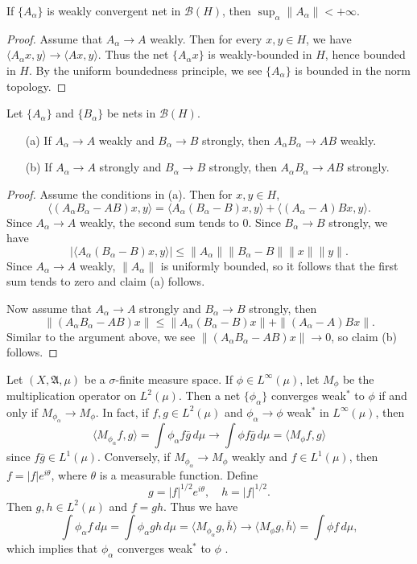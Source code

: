 \begin{proposition}\label{Hilbert space weakly convergent operator bounded}
If $\{A_\alpha\}$ is weakly convergent net in $\mathcal{B}(H)$, then $\sup_\alpha\|A_\alpha\|<+\infty$. 
\end{proposition}
\begin{proof}
Assume that $A_\alpha\to A$ weakly. Then for every $x,y\in H$, we have $\langle A_\alpha x,y\rangle\to\langle Ax,y\rangle$. Thus the net $\{A_\alpha x\}$ is weakly-bounded in $H$, hence bounded in $H$. By the uniform boundedness principle, we see $\{A_\alpha\}$ is bounded in the norm topology.
\end{proof}
\begin{proposition}\label{Hilbert space continuity of composition}
Let $\{A_\alpha\}$ and $\{B_\alpha\}$ be nets in $\mathcal{B}(H)$.
\begin{itemize}
\item[(a)] If $A_\alpha\to A$ weakly and $B_\alpha\to B$ strongly, then $A_\alpha B_\alpha\to AB$ weakly.
\item[(b)] If $A_\alpha\to A$ strongly and $B_\alpha\to B$ strongly, then $A_\alpha B_\alpha\to AB$ strongly.
\end{itemize}
\end{proposition}
\begin{proof}
Assume the conditions in (a). Then for $x,y\in H$,
\[\langle (A_\alpha B_\alpha-AB)x,y\rangle=\langle A_\alpha(B_\alpha-B)x,y\rangle+\langle (A_\alpha-A)Bx,y\rangle.\]
Since $A_\alpha\to A$ weakly, the second sum tends to $0$. Since $B_\alpha\to B$ strongly, we have
\[|\langle A_\alpha(B_\alpha-B)x,y\rangle|\leq\|A_\alpha\|\|B_\alpha-B\|\|x\|\|y\|.\]
Since $A_\alpha\to A$ weakly, $\|A_\alpha\|$ is uniformly bounded, so it follows that the first sum tends to zero and claim (a) follows.\par
Now assume that $A_\alpha\to A$ strongly and $B_\alpha\to B$ strongly, then
\[\|(A_\alpha B_\alpha-AB)x\|\leq\|A_\alpha(B_\alpha-B)x\|+\|(A_\alpha-A)Bx\|.\]
Similar to the argument above, we see $\|(A_\alpha B_\alpha-AB)x\|\to 0$, so claim (b) follows.
\end{proof}
\begin{example}
Let $(X,\mathfrak{A},\mu)$ be a $\sigma$-finite measure space. If $\phi\in L^\infty(\mu)$, let $M_\phi$ be the multiplication operator on $L^2(\mu)$. Then a net $\{\phi_\alpha\}$ converges weak$^*$ to $\phi$ if and only if $M_{\phi_\alpha}\to M_\phi$. In fact, if $f,g\in L^2(\mu)$ and $\phi_\alpha\to\phi$ weak$^*$ in $L^\infty(\mu)$, then 
\[\langle M_{\phi_\alpha}f,g\rangle=\int\phi_\alpha f\bar{g}\,d\mu\to\int\phi f\bar{g}\,d\mu=\langle M_\phi f,g\rangle\]
since $f\bar{g}\in L^1(\mu)$. Conversely, if $M_{\phi_\alpha}\to M_\phi$ weakly and $f\in L^1(\mu)$, then $f=|f|e^{i\theta}$, where $\theta$ is a measurable function. Define
\[g=|f|^{1/2}e^{i\theta},\quad h=|f|^{1/2}.\]
Then $g,h\in L^2(\mu)$ and $f=gh$. Thus we have 
\[\int\phi_\alpha f\,d\mu=\int\phi_\alpha gh\,d\mu=\langle M_{\phi_\alpha}g,\bar{h}\rangle\to\langle M_{\phi}g,\bar{h}\rangle=\int\phi f\,d\mu,\]
which implies that $\phi_\alpha$ converges weak$^*$ to $\phi$ .
\end{example}
